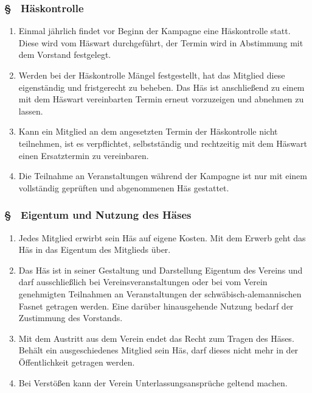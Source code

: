 \subsubsection{§ \thehoparagraphcounter\ Häskontrolle} \label{ho:par:haeskontrolle}
\begin{enumerate}
    \item \label{ho:abs:frbee0} Einmal jährlich findet vor Beginn der Kampagne eine Häskontrolle statt. Diese wird vom Häswart durchgeführt, der Termin wird in Abstimmung mit dem Vorstand festgelegt.

    \item \label{ho:abs:z2n7ta} Werden bei der Häskontrolle Mängel festgestellt, hat das Mitglied diese eigenständig und fristgerecht zu beheben. Das Häs ist anschließend zu einem mit dem Häswart vereinbarten Termin erneut vorzuzeigen und abnehmen zu lassen.

    \item \label{ho:abs:0xhhk8} Kann ein Mitglied an dem angesetzten Termin der Häskontrolle nicht teilnehmen, ist es verpflichtet, selbstständig und rechtzeitig mit dem Häswart einen Ersatztermin zu vereinbaren.

    \item \label{ho:abs:g0e7y3} Die Teilnahme an Veranstaltungen während der Kampagne ist nur mit einem vollständig geprüften und abgenommenen Häs gestattet.
\end{enumerate}

\subsubsection{§ \thehoparagraphcounter\ Eigentum und Nutzung des Häses} \label{ho:par:eigentum_nutzung_haes}
\begin{enumerate}
    \item \label{ho:abs:ruwe3z} Jedes Mitglied erwirbt sein Häs auf eigene Kosten. Mit dem Erwerb geht das Häs in das Eigentum des Mitglieds über.
    
    \item \label{ho:abs:igyjuu} Das Häs ist in seiner Gestaltung und Darstellung Eigentum des Vereins und darf ausschließlich bei Vereinsveranstaltungen oder bei vom Verein genehmigten Teilnahmen an Veranstaltungen der schwäbisch-alemannischen Fasnet getragen werden. Eine darüber hinausgehende Nutzung bedarf der Zustimmung des Vorstands.
    
    \item \label{ho:abs:fvmsrc} Mit dem Austritt aus dem Verein endet das Recht zum Tragen des Häses. Behält ein ausgeschiedenes Mitglied sein Häs, darf dieses nicht mehr in der Öffentlichkeit getragen werden.
    
    \item \label{ho:abs:bq9ddt} Bei Verstößen kann der Verein Unterlassungsansprüche geltend machen.
\end{enumerate}


